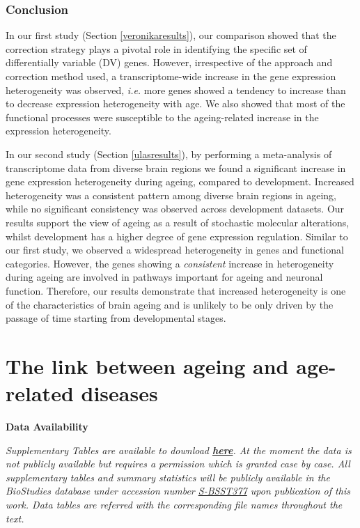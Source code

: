 \documentclass[12pt,twoside]{unicam}
\begin{document}
\hypertarget{conclusion}{%
\subsection{Conclusion}\label{conclusion}}

In our first study (Section \ref{veronikaresults}), our comparison showed that the correction strategy plays a pivotal role in identifying the specific set of differentially variable (DV) genes. However, irrespective of the approach and correction method used, a transcriptome-wide increase in the gene expression heterogeneity was observed, \emph{i.e.} more genes showed a tendency to increase than to decrease expression heterogeneity with age. We also showed that most of the functional processes were susceptible to the ageing-related increase in the expression heterogeneity.

In our second study (Section \ref{ulasresults}), by performing a meta-analysis of transcriptome data from diverse brain regions we found a significant increase in gene expression heterogeneity during ageing, compared to development. Increased heterogeneity was a consistent pattern among diverse brain regions in ageing, while no significant consistency was observed across development datasets. Our results support the view of ageing as a result of stochastic molecular alterations, whilst development has a higher degree of gene expression regulation. Similar to our first study, we observed a widespread heterogeneity in genes and functional categories. However, the genes showing a \emph{consistent} increase in heterogeneity during ageing are involved in pathways important for ageing and neuronal function. Therefore, our results demonstrate that increased heterogeneity is one of the characteristics of brain ageing and is unlikely to be only driven by the passage of time starting from developmental stages.

\hypertarget{UKBBChapter}{%
\chapter{The link between ageing and age-related diseases}\label{UKBBChapter}}

\small

\textbf{Data Availability}

\emph{Supplementary Tables are available to download \textbf{\href{https://drive.google.com/file/d/1j6AJfTOD9euHCdZTlhtWYn22M1KdaQ5A/view?usp=sharing}{here}}. At the moment the data is not publicly available but requires a permission which is granted case by case. All supplementary tables and summary statistics will be publicly available in the BioStudies database under accession number \href{https://www.ebi.ac.uk/biostudies/studies/S-BSST377}{S-BSST377} upon publication of this work. Data tables are referred with the corresponding file names throughout the text.}
\end{document}
